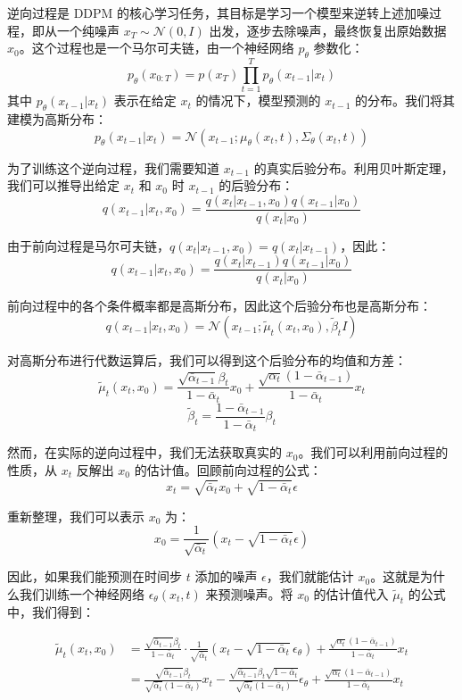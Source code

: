 \documentclass{ctexart}
\begin{document}
逆向过程是 DDPM 的核心学习任务，其目标是学习一个模型来逆转上述加噪过程，即从一个纯噪声 $x_T \sim \mathcal{N}(0, I)$ 出发，逐步去除噪声，最终恢复出原始数据 $x_0$。这个过程也是一个马尔可夫链，由一个神经网络 $p_\theta$ 参数化：
$$ p_\theta(x_{0:T}) = p(x_T) \prod_{t=1}^T p_\theta(x_{t-1} | x_t) $$
其中 $p_\theta(x_{t-1} | x_t)$ 表示在给定 $x_t$ 的情况下，模型预测的 $x_{t-1}$ 的分布。我们将其建模为高斯分布：
$$ p_\theta(x_{t-1} | x_t) = \mathcal{N}(x_{t-1}; \mu_\theta(x_t, t), \Sigma_\theta(x_t, t)) $$


为了训练这个逆向过程，我们需要知道 $x_{t-1}$ 的真实后验分布。利用贝叶斯定理，我们可以推导出给定 $x_t$ 和 $x_0$ 时 $x_{t-1}$ 的后验分布：
$$ q(x_{t-1} | x_t, x_0) = \frac{q(x_t | x_{t-1}, x_0) q(x_{t-1} | x_0)}{q(x_t | x_0)} $$

由于前向过程是马尔可夫链，$q(x_t | x_{t-1}, x_0) = q(x_t | x_{t-1})$，因此：
$$ q(x_{t-1} | x_t, x_0) = \frac{q(x_t | x_{t-1}) q(x_{t-1} | x_0)}{q(x_t | x_0)} $$

前向过程中的各个条件概率都是高斯分布，因此这个后验分布也是高斯分布：
$$ q(x_{t-1} | x_t, x_0) = \mathcal{N}(x_{t-1}; \tilde{\mu}_t(x_t, x_0), \tilde{\beta}_t I) $$

对高斯分布进行代数运算后，我们可以得到这个后验分布的均值和方差：
$$ \tilde{\mu}_t(x_t, x_0) = \frac{\sqrt{\bar{\alpha}_{t-1}}\beta_t}{1-\bar{\alpha}_t}x_0 + \frac{\sqrt{\alpha_t}(1-\bar{\alpha}_{t-1})}{1-\bar{\alpha}_t}x_t $$
$$ \tilde{\beta}_t = \frac{1-\bar{\alpha}_{t-1}}{1-\bar{\alpha}_t}\beta_t $$

然而，在实际的逆向过程中，我们无法获取真实的 $x_0$。我们可以利用前向过程的性质，从 $x_t$ 反解出 $x_0$ 的估计值。回顾前向过程的公式：
$$ x_t = \sqrt{\bar{\alpha}_t}x_0 + \sqrt{1 - \bar{\alpha}_t}\epsilon $$

重新整理，我们可以表示 $x_0$ 为：
$$ x_0 = \frac{1}{\sqrt{\bar{\alpha}_t}}(x_t - \sqrt{1-\bar{\alpha}_t}\epsilon) $$

因此，如果我们能预测在时间步 $t$ 添加的噪声 $\epsilon$，我们就能估计 $x_0$。这就是为什么我们训练一个神经网络 $\epsilon_\theta(x_t, t)$ 来预测噪声。将 $x_0$ 的估计值代入 $\tilde{\mu}_t$ 的公式中，我们得到：

\begin{align*}
\tilde{\mu}_t(x_t, x_0) &= \frac{\sqrt{\bar{\alpha}_{t-1}}\beta_t}{1-\bar{\alpha}_t} \cdot \frac{1}{\sqrt{\bar{\alpha}_t}}(x_t - \sqrt{1-\bar{\alpha}_t}\epsilon_\theta) + \frac{\sqrt{\alpha_t}(1-\bar{\alpha}_{t-1})}{1-\bar{\alpha}_t}x_t \\
&= \frac{\sqrt{\bar{\alpha}_{t-1}}\beta_t}{\sqrt{\bar{\alpha}_t}(1-\bar{\alpha}_t)}x_t - \frac{\sqrt{\bar{\alpha}_{t-1}}\beta_t\sqrt{1-\bar{\alpha}_t}}{\sqrt{\bar{\alpha}_t}(1-\bar{\alpha}_t)}\epsilon_\theta + \frac{\sqrt{\alpha_t}(1-\bar{\alpha}_{t-1})}{1-\bar{\alpha}_t}x_t
\end{align*}
\end{document}
